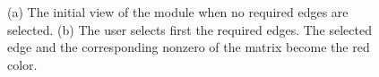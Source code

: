 \documentclass[12pt, twoside,a4paper,toc=bibliography]{scrbook}
\begin{document}
\begin{figure}
\centering
{}
\hfill
{}
\caption{
(a) The initial view of the module when no required edges are selected.
(b) The user selects first the required edges. The selected edge and the corresponding
nonzero of the matrix become the red color.}
\label{partial_coloring_bad_coloring}
\end{figure}
\end{document}
